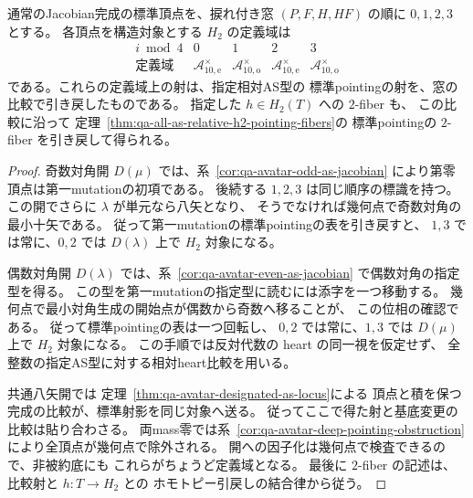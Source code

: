 \begin{theorem}[曲線型avatarの四標準頂点の相対定義域]
\label{thm:qa-avatar-all-standard-pointing-domains}
通常のJacobian完成の標準頂点を、捩れ付き窓
$(P,F,H,HF)$ の順に $0,1,2,3$ とする。
各頂点を構造対象とする $H_2$ の定義域は
\[
 \begin{array}{c|cccc}
  i\bmod4&0&1&2&3\\ \hline
  \text{定義域}
   &\mathcal A_{10,\mathrm e}^{\times}
   &\mathcal A_{10,\mathrm o}^{\times}
   &\mathcal A_{10,\mathrm e}^{\times}
   &\mathcal A_{10,\mathrm o}^{\times}
 \end{array}
\]
である。これらの定義域上の射は、指定相対AS型の
標準pointingの射を、窓の比較で引き戻したものである。
指定した $h\in H_2(T)$ への $2$-fiber も、
この比較に沿って
定理~\ref{thm:qa-all-as-relative-h2-pointing-fibers}の
標準pointingの $2$-fiber を引き戻して得られる。
\end{theorem}
\begin{proof}
奇数対角開 $D(\mu)$ では、系~\ref{cor:qa-avatar-odd-as-jacobian}
により第零頂点は第一mutationの初項である。
後続する $1,2,3$ は同じ順序の標識を持つ。
この開でさらに $\lambda$ が単元なら八矢となり、
そうでなければ幾何点で奇数対角の最小十矢である。
従って第一mutationの標準pointingの表を引き戻すと、
$1,3$ では常に、$0,2$ では $D(\lambda)$ 上で
$H_2$ 対象になる。

偶数対角開 $D(\lambda)$ では、系~\ref{cor:qa-avatar-even-as-jacobian}
で偶数対角の指定型を得る。
この型を第一mutationの指定型に読むには添字を一つ移動する。
幾何点で最小対角生成の開始点が偶数から奇数へ移ることが、
この位相の確認である。
従って標準pointingの表は一つ回転し、
$0,2$ では常に、$1,3$ では $D(\mu)$ 上で $H_2$ 対象になる。
この手順では反対代数の heart の同一視を仮定せず、
全整数の指定AS型に対する相対heart比較を用いる。

共通八矢開では
定理~\ref{thm:qa-avatar-designated-as-locus}による
頂点と積を保つ完成の比較が、標準射影を同じ対象へ送る。
従ってここで得た射と基底変更の比較は貼り合わさる。
両mass零では系~\ref{cor:qa-avatar-deep-pointing-obstruction}
により全頂点が幾何点で除外される。
開への因子化は幾何点で検査できるので、非被約底にも
これらがちょうど定義域となる。
最後に $2$-fiber の記述は、比較射と $h:T\to H_2$ との
ホモトピー引戻しの結合律から従う。
\end{proof}

